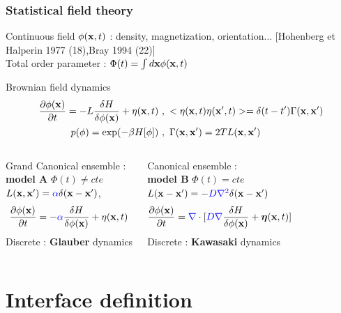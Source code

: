 \documentclass[9pt, dvipsnames]{beamer} %
\newcommand{\bx}{{\bf x}} %
\begin{document}
\begin{frame}
    \frametitle{Statistical field theory}
    Continuous field $\phi(\bx,t)$  : density, magnetization, orientation... {\footnotesize [Hohenberg et Halperin 1977 (18),Bray 1994 (22)]} \\
    Total order parameter : $\Phi(t) = \int d\bx \phi(\bx,t)$ 
    \begin{block}{Brownian field dynamics}
		\begin{align}
    		\frac{\partial \phi(\bx)}{\partial t} = - L \frac{\delta H}{\delta \phi(\bx)} + \eta(\bx,t)  &~,~  < \eta(\bx,t)\eta(\bx',t)> =\delta(t-t')\Gamma(\bx,{\bf x'}) \\
           p(\phi) = \exp(-\beta H[\phi]) &~, ~	\Gamma(\bx,\bx') =2T L(\bx,\bx')
		\end{align}    
    \end{block}
    \begin{columns}
    \begin{block}{Grand Canonical ensemble : \\ {\bf model A}} 
         $\Phi(t) \neq cte$ \\
        $L(\bx,\bx')=\textcolor{blue}{\alpha}\delta(\bx-\bx')$,
		\begin{equation}
    		\frac{\partial \phi(\bx)}{\partial t}= -\textcolor{blue}{\alpha} \frac{\delta H}{\delta \phi(\bx)} + \eta(\bx,t) 
		\end{equation}
		Discrete : {\bf Glauber} dynamics
    \end{block}    

    \begin{block}{Canonical ensemble : \\ {\bf model B}}
        $\Phi(t) = cte$ \\
        $L(\bx-\bx')= -\textcolor{blue}{D\nabla^2} \delta(\bx-{\bf x'})$
		\begin{equation}
    		\frac{\partial \phi(\bx)}{\partial t}= \textcolor{blue}{\nabla}\cdot[ \textcolor{blue}{D\nabla } \frac{\delta H}{\delta \phi(\bx)} + {\boldsymbol\eta}(\bx,t)]
		\end{equation}
		Discrete : {\bf Kawasaki} dynamics		
    \end{block}
    \end{columns}
\end{frame}


\section{Interface definition}
\end{document}
